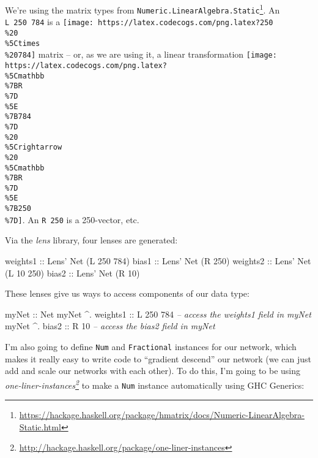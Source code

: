 \documentclass[]{article}
\newenvironment{Shaded}{}{}
\newcommand{\CommentTok}[1]{\textcolor[rgb]{0.38,0.63,0.69}{\textit{#1}}}
\newcommand{\DataTypeTok}[1]{\textcolor[rgb]{0.56,0.13,0.00}{#1}}
\newcommand{\DecValTok}[1]{\textcolor[rgb]{0.25,0.63,0.44}{#1}}
\newcommand{\FunctionTok}[1]{\textcolor[rgb]{0.02,0.16,0.49}{#1}}
\newcommand{\NormalTok}[1]{#1}
\newcommand{\OtherTok}[1]{\textcolor[rgb]{0.00,0.44,0.13}{#1}}
\renewcommand{\href}[2]{#2\footnote{\url{#1}}}
\begin{document}
We're using the matrix types from
\href{https://hackage.haskell.org/package/hmatrix/docs/Numeric-LinearAlgebra-Static.html}{\texttt{Numeric.LinearAlgebra.Static}}.
An \texttt{L\ 250\ 784} is a
\texttt{[image: https://latex.codecogs.com/png.latex?250\\\%20\\\%5Ctimes\\\%20784]}
matrix -- or, as we are using it, a linear transformation
\texttt{[image: https://latex.codecogs.com/png.latex?\\\%5Cmathbb\\\%7BR\\\%7D\\\%5E\\\%7B784\\\%7D\\\%20\\\%5Crightarrow\\\%20\\\%5Cmathbb\\\%7BR\\\%7D\\\%5E\\\%7B250\\\%7D]}.
An \texttt{R\ 250} is a 250-vector, etc.

Via the \emph{lens} library, four lenses are generated:

\begin{Shaded}
\begin{Highlighting}[]
\OtherTok{weights1 ::} \DataTypeTok{Lens'} \DataTypeTok{Net}\NormalTok{ (}\DataTypeTok{L} \DecValTok{250} \DecValTok{784}\NormalTok{)}
\OtherTok{bias1    ::} \DataTypeTok{Lens'} \DataTypeTok{Net}\NormalTok{ (}\DataTypeTok{R} \DecValTok{250}\NormalTok{)}
\OtherTok{weights2 ::} \DataTypeTok{Lens'} \DataTypeTok{Net}\NormalTok{ (}\DataTypeTok{L} \DecValTok{10}  \DecValTok{250}\NormalTok{)}
\OtherTok{bias2    ::} \DataTypeTok{Lens'} \DataTypeTok{Net}\NormalTok{ (}\DataTypeTok{R} \DecValTok{10}\NormalTok{)}
\end{Highlighting}
\end{Shaded}

These lenses give us ways to access components of our data type:

\begin{Shaded}
\begin{Highlighting}[]
\OtherTok{myNet             ::} \DataTypeTok{Net}
\NormalTok{myNet }\FunctionTok{^.}\OtherTok{ weights1 ::} \DataTypeTok{L} \DecValTok{250} \DecValTok{784}  \CommentTok{-- access the weights1 field in myNet}
\NormalTok{myNet }\FunctionTok{^.}\OtherTok{ bias2    ::} \DataTypeTok{R}  \DecValTok{10}      \CommentTok{-- access the bias2 field in myNet}
\end{Highlighting}
\end{Shaded}

I'm also going to define \texttt{Num} and \texttt{Fractional} instances for our
network, which makes it really easy to write code to ``gradient descend'' our
network (we can just add and scale our networks with each other). To do this,
I'm going to be using
\emph{\href{http://hackage.haskell.org/package/one-liner-instances}{one-liner-instances}}
to make a \texttt{Num} instance automatically using GHC Generics:
\end{document}
